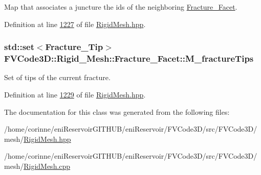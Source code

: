 Map that associates a juncture the ids of the neighboring \hyperlink{classFVCode3D_1_1Rigid__Mesh_1_1Fracture__Facet}{Fracture\+\_\+\+Facet}. 



Definition at line \hyperlink{RigidMesh_8hpp_source_l01227}{1227} of file \hyperlink{RigidMesh_8hpp_source}{Rigid\+Mesh.\+hpp}.

\subsubsection[{\texorpdfstring{M\+\_\+fracture\+Tips}{M_fractureTips}}]{\setlength{\rightskip}{0pt plus 5cm}std\+::set$<${\bf Fracture\+\_\+\+Tip}$>$ F\+V\+Code3\+D\+::\+Rigid\+\_\+\+Mesh\+::\+Fracture\+\_\+\+Facet\+::\+M\+\_\+fracture\+Tips\hspace{0.3cm}{\ttfamily [private]}}\hypertarget{classFVCode3D_1_1Rigid__Mesh_1_1Fracture__Facet_a7bd9c81fb6dca96265060615307b14ad}{}\label{classFVCode3D_1_1Rigid__Mesh_1_1Fracture__Facet_a7bd9c81fb6dca96265060615307b14ad}


Set of tips of the current fracture. 



Definition at line \hyperlink{RigidMesh_8hpp_source_l01229}{1229} of file \hyperlink{RigidMesh_8hpp_source}{Rigid\+Mesh.\+hpp}.



The documentation for this class was generated from the following files\+:\begin{DoxyCompactItemize}
\item 
/home/corinne/eni\+Reservoir\+G\+I\+T\+H\+U\+B/eni\+Reservoir/\+F\+V\+Code3\+D/src/\+F\+V\+Code3\+D/mesh/\hyperlink{RigidMesh_8hpp}{Rigid\+Mesh.\+hpp}\item 
/home/corinne/eni\+Reservoir\+G\+I\+T\+H\+U\+B/eni\+Reservoir/\+F\+V\+Code3\+D/src/\+F\+V\+Code3\+D/mesh/\hyperlink{RigidMesh_8cpp}{Rigid\+Mesh.\+cpp}\end{DoxyCompactItemize}
